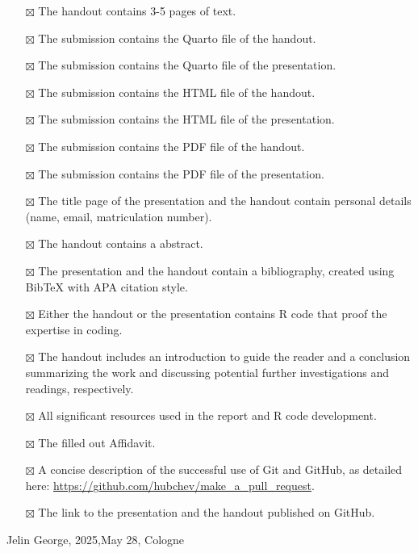 \documentclass[
  man,
  floatsintext,
  longtable,
  nolmodern,
  notxfonts,
  notimes,
  colorlinks=true,linkcolor=blue,citecolor=blue,urlcolor=blue]{apa7}
\providecommand{\tightlist}{%
  \setlength{\itemsep}{0pt}\setlength{\parskip}{0pt}}
\begin{document}
\begin{itemize}
\tightlist
\item[$\boxtimes$]
  The handout contains 3-5 pages of text.
\item[$\boxtimes$]
  The submission contains the Quarto file of the handout.
\item[$\boxtimes$]
  The submission contains the Quarto file of the presentation.
\item[$\boxtimes$]
  The submission contains the HTML file of the handout.
\item[$\boxtimes$]
  The submission contains the HTML file of the presentation.
\item[$\boxtimes$]
  The submission contains the PDF file of the handout.
\item[$\boxtimes$]
  The submission contains the PDF file of the presentation.
\item[$\boxtimes$]
  The title page of the presentation and the handout contain personal
  details (name, email, matriculation number).
\item[$\boxtimes$]
  The handout contains a abstract.
\item[$\boxtimes$]
  The presentation and the handout contain a bibliography, created using
  BibTeX with APA citation style.
\item[$\boxtimes$]
  Either the handout or the presentation contains R code that proof the
  expertise in coding.
\item[$\boxtimes$]
  The handout includes an introduction to guide the reader and a
  conclusion summarizing the work and discussing potential further
  investigations and readings, respectively.
\item[$\boxtimes$]
  All significant resources used in the report and R code development.
\item[$\boxtimes$]
  The filled out Affidavit.
\item[$\boxtimes$]
  A concise description of the successful use of Git and GitHub, as
  detailed here: \url{https://github.com/hubchev/make_a_pull_request}.
\item[$\boxtimes$]
  The link to the presentation and the handout published on GitHub.
\end{itemize}

Jelin George, 2025,May 28, Cologne
\end{document}
